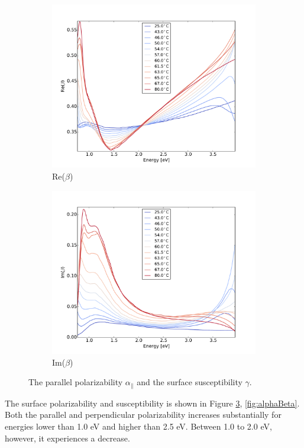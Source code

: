 \begin{figure}[h!]
    \begin{subfigure}[b]{0.49\textwidth}
        \centering
        \includegraphics[width=\textwidth]{Results/Sim3/re_beta.pdf}
        \caption{Re($\beta$)}
        \label{fig:2}
    \end{subfigure}
    \begin{subfigure}[b]{0.49\textwidth}
        \centering
        \includegraphics[width=\textwidth]{Results/Sim3/im_beta.pdf}
        \caption{Im($\beta$)}
        \label{fig:2}
    \end{subfigure}
    \caption{
       The parallel polarizability  $\alpha_{\parallel}$ and the surface susceptibility $\gamma$.
    }
    \label{fig:alphaGamma}
\end{figure}
%
The surface polarizability and susceptibility is shown in Figure 
\ref{fig:alphaGamma}, \ref{fig:alphaBeta}. Both the parallel and perpendicular polarizability 
increases substantially for energies lower than 1.0 eV and higher than 2.5 eV. Between 1.0 to 2.0 eV,
however, it experiences a decrease.

